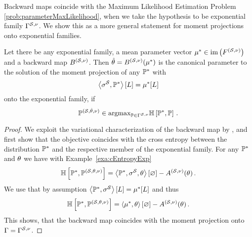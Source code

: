 
Backward maps coincide with the Maximum Likelihood Estimation Problem \eqref{prob:parameterMaxLikelihood}, when we take the hypothesis to be exponential family $\Gamma^{\mathcal{S},\nu}$. %
We show this as a more general statement for moment projections onto exponential families.

\begin{theorem}
    Let there be any exponential family, a mean parameter vector $\mu^*\in\mathrm{im}\left(F^{(\mathcal{S},\nu)}\right)$ and a backward map $B^{(\mathcal{S},\nu)}$.
    Then $\hat{\theta}=B^{(\mathcal{S},\nu)}(\mu^*)$ is the canonical parameter to the solution of the moment projection  of any $\mathbb{P}^*$ with
    \begin{align*}
        \left\langle \sigma^{\mathcal{S}},\mathbb{P}^*\right\rangle \left[ L \right]=\mu^*[L]
    \end{align*}
    onto the exponential family, if
    \[ \mathbb{P}^{(\mathcal{S},\hat{\theta},\nu)} \in \mathrm{argmax}_{\mathbb{P}\in\Gamma^{\mathcal{S},\nu}} \mathbb{H}\left[\mathbb{P}^*,\mathbb{P}\right]  \, . \]

\end{theorem}
\begin{proof}
    We exploit the variational characterization of the backward map by , and first show that the objective coincides with the cross entropy between the distribution $\mathbb{P}^*$ and the respective member of the exponential family.
    For any $\mathbb{P}^*$ and $\theta$ we have with Example~\ref{exa:cEntropyExp}
    \begin{align*}
        \mathbb{H}\left[\mathbb{P}^*,\mathbb{P}^{(\mathcal{S},\theta,\nu)}\right]
        = \left\langle \mathbb{P}^*,\sigma^{\mathcal{S}},\theta\right\rangle \left[ \varnothing \right] -A^{(\mathcal{S},\nu)}(\theta) \, .
    \end{align*}
    We use that by assumption $\left\langle \mathbb{P}^*,\sigma^{\mathcal{S}}\right\rangle \left[ L \right]=\mu^*[L]$ and thus
    \begin{align*}
        \mathbb{H}\left[\mathbb{P}^*,\mathbb{P}^{(\mathcal{S},\theta,\nu)}\right]
        =   \left\langle \mu^*,\theta\right\rangle \left[ \varnothing \right] -A^{(\mathcal{S},\nu)}(\theta) \, .
    \end{align*}
    This shows, that the backward map coincides with the moment projection onto $\Gamma=\Gamma^{\mathcal{S},\nu}$.
\end{proof}

